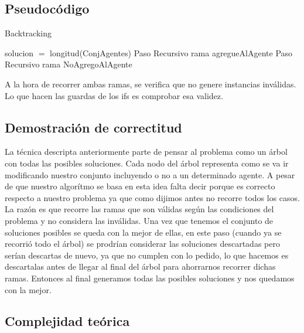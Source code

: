 \subsection{Pseudocódigo}

\begin{algorithm}[H]
\caption{Backtracking}\label{Ej1}

\begin{algorithmic}[H]
\State solucion $=$ longitud(ConjAgentes)
\EndIf
\EndIf
{}
\State Paso Recursivo rama agregueAlAgente
\EndIf
{}
\State Paso Recursivo rama NoAgregoAlAgente
\EndIf
\EndProcedure
\end{algorithmic}
\end{algorithm}

	A la hora de recorrer ambas ramas, se verifica que no genere instancias inválidas. Lo que hacen las guardas de los ifs es comprobar esa validez.
\subsection{Demostración de correctitud}

	La técnica descripta anteriormente parte de pensar al problema como un árbol con todas las posibles soluciones. Cada nodo del árbol representa como se va ir modificando nuestro conjunto incluyendo o no a un determinado agente. A pesar de que nuestro algorítmo se basa en esta idea falta decir porque es correcto respecto a nuestro problema ya que como dijimos antes no recorre todos los casos. La razón es que recorre las ramas que son válidas según las condiciones del problema y no considera las inválidas. Una vez que tenemos el conjunto de soluciones posibles se queda con la mejor de ellas, en este paso (cuando ya se recorrió todo el árbol) se prodrían considerar las soluciones descartadas pero serían descartas de nuevo, ya que no cumplen con lo pedido, lo que hacemos es descartalas antes de llegar al final del árbol para ahorrarnos recorrer dichas ramas. Entonces al final generamos todas las posibles soluciones y nos quedamos con la mejor.

\subsection{Complejidad teórica}
	
